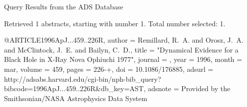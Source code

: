 Query Results from the ADS Database


Retrieved 1 abstracts, starting with number 1.  Total number selected: 1.

@ARTICLE{1996ApJ...459..226R,
   author = {{Remillard}, R.~A. and {Orosz}, J.~A. and {McClintock}, J.~E. and 
	{Bailyn}, C.~D.},
    title = "{Dynamical Evidence for a Black Hole in X-Ray Nova Ophiuchi 1977}",
  journal = {\apj},
     year = 1996,
    month = mar,
   volume = 459,
    pages = {226-+},
      doi = {10.1086/176885},
   adsurl = {http://adsabs.harvard.edu/cgi-bin/nph-bib_query?bibcode=1996ApJ...459..226R&db_key=AST},
  adsnote = {Provided by the Smithsonian/NASA Astrophysics Data System}
}


